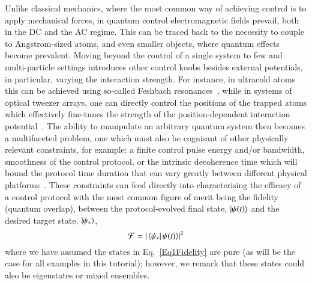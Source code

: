Unlike classical mechanics, where the most common way of achieving control is to apply mechanical forces, in quantum control electromagnetic fields prevail, both in the DC and the AC regime. This can be traced back to the necessity to couple to Angstrom-sized atoms, and even smaller objects, where quantum effects become prevalent. Moving beyond the control of a single system to few and multi-particle settings introduces other control knobs besides external potentials, in particular, varying the interaction strength. For instance, in ultracold atoms this can be achieved using so-called Feshbach resonances~\cite{bloch2008manybody}, while in systems of optical tweezer arrays, one can directly control the positions of the trapped atoms which effectively fine-tunes the strength of the position-dependent interaction potential~\cite{Kaufman2021}. The ability to manipulate an arbitrary quantum system then becomes a multifaceted problem, one which must also be cognisant of other physically relevant constraints, for example: a finite control pulse energy and/or bandwidth, smoothness of the control protocol, or the intrinsic decoherence time which will bound the protocol time duration that can vary greatly between different physical platforms~\cite{Koch2022, STAreview, PRXQtutorial, baldwin2021optimal}. These constraints can feed directly into characterising the efficacy of a control protocol with the most common figure of merit being the fidelity (quantum overlap), between the protocol-evolved final state, $\ket{\psi(t)}$ and the desired target state, $\ket{\psi_*}$, 
\begin{equation}
\label{Eq1Fidelity}
\mathcal{F} = \vert \bra{\psi_*} \psi(t)\rangle \vert^2
\end{equation}
where we have assumed the states in Eq.~\eqref{Eq1Fidelity} are pure (as will be the case for all examples in this tutorial); however, we remark that these states could also be eigenstates or mixed ensembles. 
